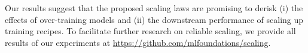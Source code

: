 Our results suggest that the proposed scaling laws are promising to derisk (i) the effects of over-training models and (ii) the downstream performance of scaling up training recipes.
To facilitate further research on reliable scaling, we provide all results of our experiments at \url{https://github.com/mlfoundations/scaling}.